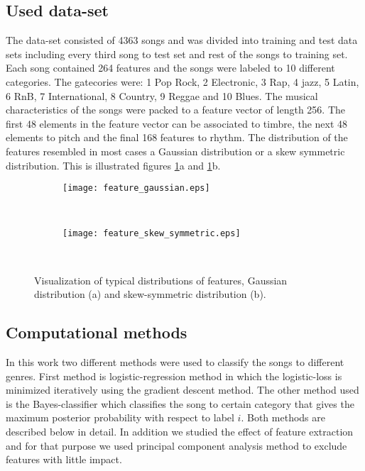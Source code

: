 \documentclass[aps,prb,10pt,twocolumn,groupedaddress]{revtex4-1}
\begin{document}
\subsection{Used data-set}
\label{sec:used_data_set}
The data-set consisted of 4363 songs and was divided into training and test data
sets including every third song to test set and rest of the songs to training
set. Each song contained 264 features and the songs were labeled to 10
different categories. The gatecories were: 1 Pop Rock, 2 Electronic, 3 Rap,
4 jazz, 5 Latin, 6 RnB, 7 International, 8 Country, 9 Reggae and 10 Blues.
The musical characteristics of the songs were packed to a feature
vector of length 256. The first 48 elements in the feature vector can be
associated to timbre, the next 48 elements to pitch and the final 168 features
to rhythm. The distribution of the features resembled in most cases a Gaussian
distribution or a skew symmetric distribution. This is illustrated figures
\ref{fig:feature_distribution}a and \ref{fig:feature_distribution}b.
\begin{figure}[!t]
  \centering
  \begin{subfigure}[]{0.38\textwidth}
    \centering
    \texttt{[image: feature\_gaussian.eps]}
    \caption{}
  \end{subfigure}\\
  \centering
  \begin{subfigure}[]{0.38\textwidth}
    \centering
    \texttt{[image: feature\_skew\_symmetric.eps]}
    \caption{}
  \end{subfigure}\\
  \caption{Visualization of typical distributions of features, Gaussian distribution (a) and skew-symmetric distribution (b).}
  \label{fig:feature_distribution}
\end{figure}

\subsection{Computational methods}
\label{sec:computational_methods}
In this work two different methods were used to classify the songs to different
genres. First method is logistic-regression method in which the logistic-loss
is minimized iteratively using the gradient descent method.
The other method used is the Bayes-classifier which classifies the song to
certain category that gives the maximum posterior probability with respect to
label $i$. Both methods are described below in detail. In addition we studied
the effect of feature extraction and for that purpose we used principal
component analysis method to exclude features with little impact. 
\end{document}
